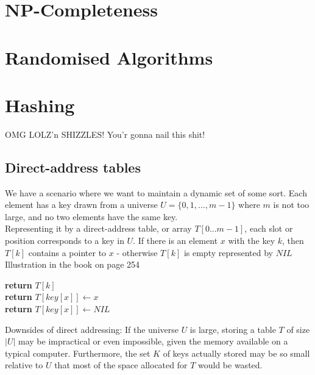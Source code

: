\documentclass[12pt]{article}
\begin{document}
\section{NP-Completeness}
\newpage

\section{Randomised Algorithms}
\newpage

\section{Hashing}
OMG LOLZ'n SHIZZLES! You'r gonna nail this shit!

\subsection{Direct-address tables}
We have a scenario where we want to maintain a dynamic set of some sort. Each element has a key drawn from a universe $U = \{0, 1, ..., m-1\}$ where $m$ is not too large, and no two elements have the same key. \\

Representing it by a direct-address table, or array $T[0...m-1]$, each slot or position corresponds to a key  in $U$. If there is an element $x$ with the key $k$, then $T[k]$ contains a pointer to $x$ - otherwise $T[k]$ is empty represented by $NIL$\\

Illustration in the book on page 254
\begin{algorithm}
\begin{algorithmic}[1]
   \State \textbf{return} $T[k]$\\
   
   \State \textbf{return} $T[key[x]] \leftarrow x$\\

   \State \textbf{return} $T[key[x]] \leftarrow NIL$
\end{algorithmic}
\end{algorithm}

Downsides of direct addressing: If the universe $U$ is large, storing a table $T$ of size $|U|$ may be impractical or even impossible, given the memory available on a typical computer. Furthermore, the set $K$ of keys actually stored may be so small relative to $U$ that most of the space allocated for $T$ would be wasted. 
\end{document}
